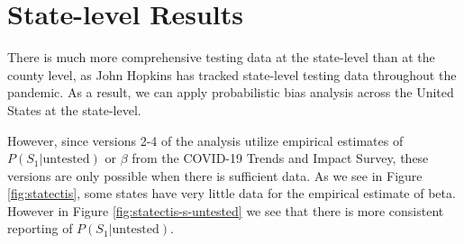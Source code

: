 \documentclass[12pt,twoside]{smiththesis}
\begin{document}
\newpage

\hypertarget{state-level-results}{%
\section{State-level Results}\label{state-level-results}}

There is much more comprehensive testing data at the state-level than at the county level, as John Hopkins has tracked state-level testing data throughout the pandemic.
As a result, we can apply probabilistic bias analysis across the United States at the state-level.

However, since versions 2-4 of the analysis utilize empirical estimates of \(P(S_1|\text{untested})\) or \(\beta\) from the COVID-19 Trends and Impact Survey, these versions are only possible when there is sufficient data. As we see in Figure \ref{fig:statectis}, some states have very little data for the empirical estimate of beta. However in Figure \ref{fig:statectis-s-untested} we see that there is more consistent reporting of \(P(S_1|\text{untested})\).
\end{document}
